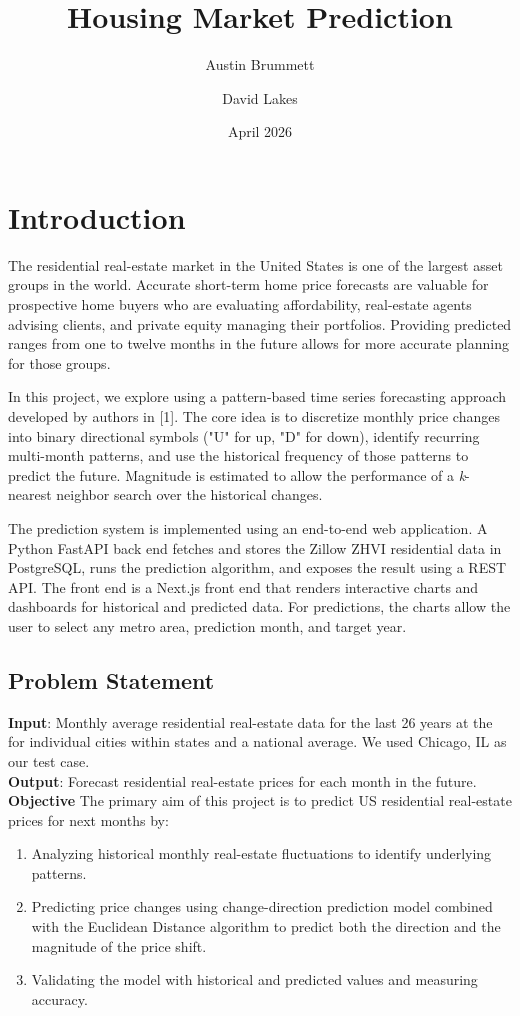 \documentclass{article}
\title{Housing Market Prediction}
\author{Austin Brummett \and David Lakes }
\date{April 2026}
\begin{document}
\maketitle

\section{Introduction}
The residential real-estate market in the United States is one of the largest asset groups in the world. Accurate short-term home price forecasts are valuable for prospective home buyers who are evaluating affordability, real-estate agents advising clients, and private equity managing their portfolios. Providing predicted ranges from one to twelve months in the future allows for more accurate planning for those groups.

In this project, we explore using a pattern-based time series forecasting approach developed by authors in [1]. The core idea is to discretize monthly price changes into binary directional symbols ("U" for up, "D" for down), identify recurring multi-month patterns, and use the historical frequency of those patterns to predict the future. Magnitude is estimated to allow the performance of a \textit{k}-nearest neighbor search over the historical changes.

The prediction system is implemented using an end-to-end web application. A Python FastAPI back end fetches and stores the Zillow ZHVI residential data \cite{zillow} in  PostgreSQL, runs the prediction algorithm, and exposes the result using a REST API. The front end is a Next.js front end that renders interactive charts and dashboards for historical and predicted data. For predictions, the charts allow the user to select any metro area, prediction month, and target year.
\subsection{Problem Statement}
\textbf{Input}: Monthly average residential real-estate data for the last 26 years at the for individual cities within states and a national average. We used Chicago, IL as our test case.\\
\textbf{Output}: Forecast residential real-estate prices for each month in the future.\\
\textbf{Objective} The primary aim of this project is to predict US residential real-estate prices for next months by:
\begin{enumerate}
    \item Analyzing historical monthly real-estate fluctuations to identify underlying patterns.
    \item Predicting price changes using change-direction prediction model combined with the Euclidean Distance algorithm to predict both the direction and the magnitude of the price shift.
\item Validating the model with historical and predicted values and measuring accuracy.
\end{enumerate}
\end{document}
